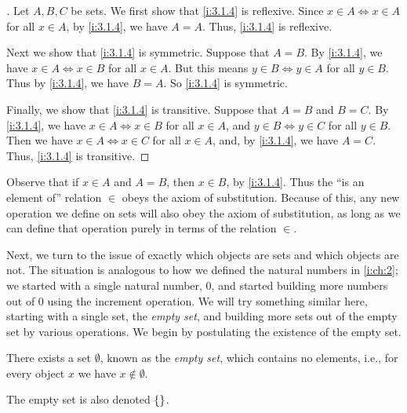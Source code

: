 \begin{proof}[]
  Let \(A, B, C\) be sets.
  We first show that \cref{i:3.1.4} is reflexive.
  Since \(x \in A \iff x \in A\) for all \(x \in A\), by \cref{i:3.1.4}, we have \(A = A\).
  Thus, \cref{i:3.1.4} is reflexive.

  Next we show that \cref{i:3.1.4} is symmetric.
  Suppose that \(A = B\).
  By \cref{i:3.1.4}, we have \(x \in A \iff x \in B\) for all \(x \in A\).
  But this means \(y \in B \iff y \in A\) for all \(y \in B\).
  Thus by \cref{i:3.1.4}, we have \(B = A\).
  So \cref{i:3.1.4} is symmetric.

  Finally, we show that \cref{i:3.1.4} is transitive.
  Suppose that \(A = B\) and \(B = C\).
  By \cref{i:3.1.4}, we have \(x \in A \iff x \in B\) for all \(x \in A\), and \(y \in B \iff y \in C\) for all \(y \in B\).
  Then we have \(x \in A \iff x \in C\) for all \(x \in A\), and, by \cref{i:3.1.4}, we have \(A = C\).
  Thus, \cref{i:3.1.4} is transitive.
\end{proof}

\begin{note}
  Observe that if \(x \in A\) and \(A = B\), then \(x \in B\), by \cref{i:3.1.4}.
  Thus the ``is an element of'' relation \(\in\) obeys the axiom of substitution.
  Because of this, any new operation we define on sets will also obey the axiom of substitution, as long as we can define that operation purely in terms of the relation \(\in\).
\end{note}

\begin{note}
  Next, we turn to the issue of exactly which objects are sets and which objects are not.
  The situation is analogous to how we defined the natural numbers in \cref{i:ch:2};
  we started with a single natural number, \(0\), and started building more numbers out of \(0\) using the increment operation.
  We will try something similar here, starting with a single set, the \emph{empty set},
  and building more sets out of the empty set by various operations.
  We begin by postulating the existence of the empty set.
\end{note}

\begin{ax}\label{i:3.2}
  There exists a set \(\emptyset\), known as the \emph{empty set}, which contains no elements, i.e., for every object \(x\) we have \(x \notin \emptyset\).
\end{ax}

\begin{note}
  The empty set is also denoted \(\left\lbrace\right\rbrace\).
\end{note}

